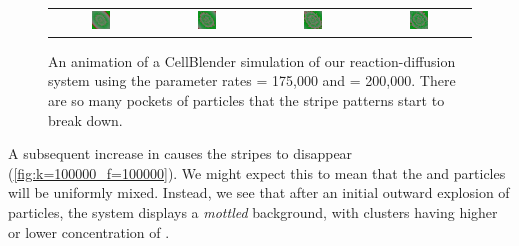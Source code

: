 \begin{figure}[h]
\begin{tabular}{c c c c}
\includegraphics[width = 0.2\textwidth]{../images/predator_prey_11_by_11_f_1.75_k_2_new_i4.png} & \includegraphics[width = 0.2\textwidth]{../images/../images/predator_prey_11_by_11_f_1.75_k_2_new_i5.png} & \includegraphics[width = 0.2\textwidth]{../images/../images/predator_prey_11_by_11_f_1.75_k_2_new_i6.png} & \includegraphics[width = 0.2\textwidth]{../images/../images/predator_prey_11_by_11_f_1.75_k_2_new_i7.png}
\end{tabular}
\caption{An animation of a CellBlender simulation of our reaction-diffusion system using the parameter rates  = 175,000 and  = 200,000. There are so many pockets of  particles that the stripe patterns start to break down.}
\label{fig:k=200000_f=175000}
\end{figure}

A subsequent increase in  causes the stripes to disappear (\autoref{fig:k=100000_f=100000}). We might expect this to mean that the  and  particles will be uniformly mixed. Instead, we see that after an initial outward explosion of  particles, the system displays a \textit{mottled} background, with clusters having higher or lower concentration of .

